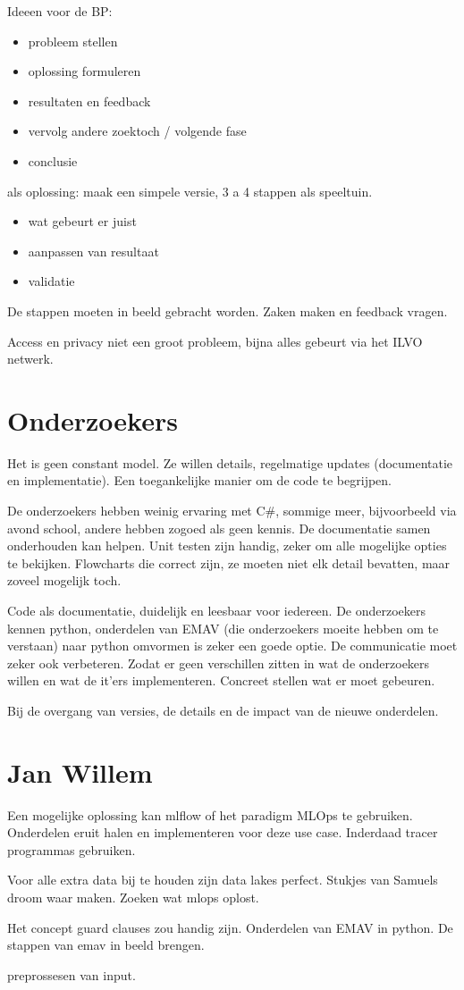 Ideeen voor de BP:
\begin{itemize}
\item probleem stellen
\item oplossing formuleren
\item resultaten en feedback
\item vervolg andere zoektoch / volgende fase
\item conclusie
\end{itemize}

als oplossing:
maak een simpele versie, 3 a 4 stappen als speeltuin.
\begin{itemize}
  \item wat gebeurt er juist
  \item aanpassen van resultaat
  \item validatie
\end{itemize}

De stappen moeten in beeld gebracht worden.
Zaken maken en feedback vragen.

Access en privacy niet een groot probleem, bijna alles gebeurt via het ILVO netwerk.
\section{Onderzoekers}
Het is geen constant model.
Ze willen details, regelmatige updates (documentatie en implementatie).
Een toegankelijke manier om de code te begrijpen.

De onderzoekers hebben weinig ervaring met C\#, sommige meer, bijvoorbeeld via avond school, andere hebben zogoed als geen kennis.
De documentatie samen onderhouden kan helpen.
Unit testen zijn handig, zeker om alle mogelijke opties te bekijken.
Flowcharts die correct zijn, ze moeten niet elk detail bevatten, maar zoveel mogelijk toch.

Code als documentatie, duidelijk en leesbaar voor iedereen.
De onderzoekers kennen python, onderdelen van EMAV (die onderzoekers moeite hebben om te verstaan) naar python omvormen is zeker een goede optie.
De communicatie moet zeker ook verbeteren.
Zodat er geen verschillen zitten in wat de onderzoekers willen en wat de it'ers implementeren.
Concreet stellen wat er moet gebeuren.

Bij de overgang van versies, de details en de impact van de nieuwe onderdelen.


\section{Jan Willem}
Een mogelijke oplossing kan mlflow of het paradigm MLOps te gebruiken.
Onderdelen eruit halen en implementeren voor deze use case.
Inderdaad tracer programmas gebruiken.

Voor alle extra data bij te houden zijn data lakes perfect.
Stukjes van Samuels droom waar maken.
Zoeken wat mlops oplost.

Het concept guard clauses zou handig zijn.
Onderdelen van EMAV in python.
De stappen van emav in beeld brengen.

preprossesen van input.
